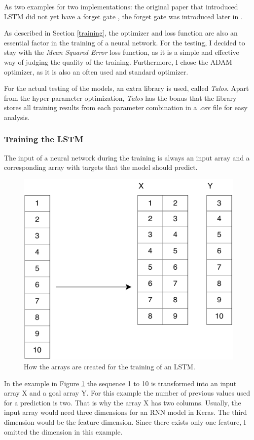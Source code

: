 As two examples for two implementations: the original paper that introduced LSTM did not yet have a forget gate \cite{lstmOrig}, the forget gate was introduced later in \cite{iet:/content/conferences/10.1049/cp_19991218}.

As described in Section \ref{training}, the optimizer and loss function are also an essential factor in the training of a neural network.
For the testing, I decided to stay with the \textit{Mean Squared Error} loss function, as it is a simple and effective way of judging the quality of the training.
Furthermore, I chose the ADAM optimizer, as it is also an often used and standard optimizer.

For the actual testing of the models, an extra library is used, called \textit{Talos}.
Apart from the hyper-parameter optimization, \textit{Talos} has the bonus that the library stores all training results from each parameter combination in a .csv file for easy analysis.

\subsubsection{Training the LSTM}
The input of a neural network during the training is always an input array and a corresponding array with targets that the model should predict.

\begin{figure}
	\centering
	\includegraphics[width=0.5\linewidth]{Pictures/LSTM_Training}
	\caption{How the arrays are created for the training of an LSTM.}
	\label{fig:lstmtraining}
\end{figure}

In the example in Figure \ref{fig:lstmtraining} the sequence 1 to 10 is transformed into an input array X and a goal array Y.
For this example the number of previous values used for a prediction is two.
That is why the array X has two columns.
Usually, the input array would need three dimensions for an RNN model in Keras.
The third dimension would be the feature dimension.
Since there exists only one feature, I omitted the dimension in this example.

